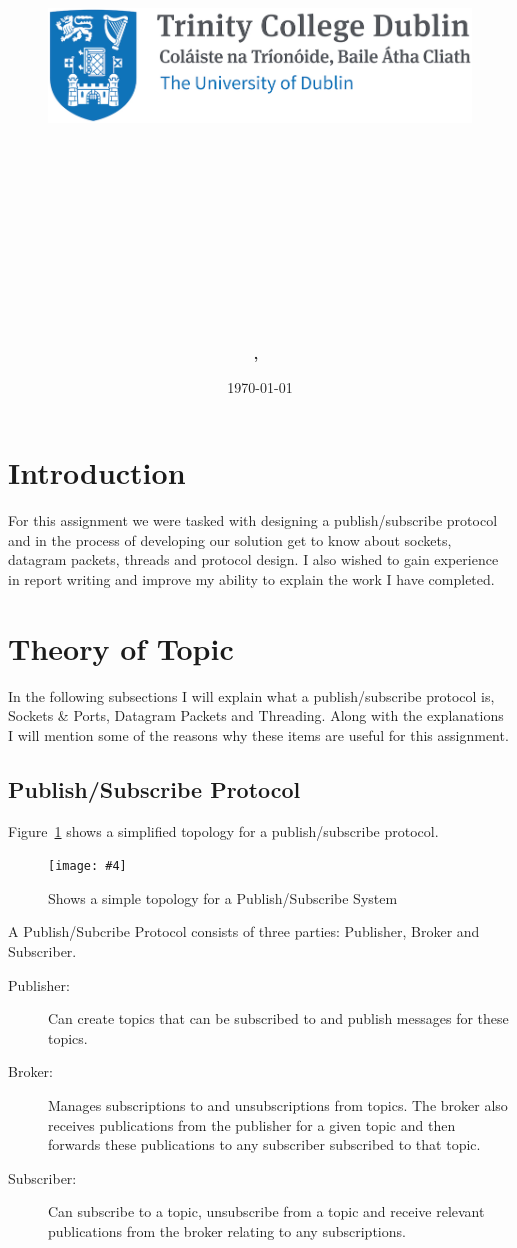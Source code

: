 \documentclass{article}
\title{
\vspace{-1in}
\begin{figure}[!ht]
\flushleft
\includegraphics[width=0.4\linewidth]{reduced-trinity.png}
\end{figure}
\vspace{-0.5cm}
\hrulefill \\
\vspace{0.5cm}
\textmd{\textbf{\moduleCode\ \moduleName}}\\
\textmd{\textbf{\assignmentTitle}}\\
\vspace{0.5cm}
\hrulefill \\
}
\author{\textbf{\authorName,\ \authorID}}
\date{\today}
\newcommand{\includefigure}[4]{
\begin{figure}[htb]
\centering
\texttt{[image: \#4]}
\captionsetup{width=.8\linewidth} 
\caption[#2]{#3}
\label{#1}
\end{figure}
}
\begin{document}
\lstset{language=Java, captionpos=b, frame=single}
\captionsetup{width=.8\linewidth} 

\maketitle
\tableofcontents
\vspace{0.5in}

\pagebreak

\section{Introduction}
\label{sec:Intro}

For this assignment we were tasked with designing a publish/subscribe protocol and in the process of developing our solution get to know about sockets, datagram packets, threads and protocol design. I also wished to gain experience in report writing and improve my ability to explain the work I have completed. 


\section{Theory of Topic}
\label{sec:Theory}

In the following subsections I will explain what a publish/subscribe protocol is, Sockets {\&} Ports, Datagram Packets and Threading. Along with the explanations I will mention some of the reasons why these items are useful for this assignment.


\subsection{Publish/Subscribe Protocol}
Figure~\ref{fig:PublishSubscribe} shows a simplified topology for a publish/subscribe protocol.
\includefigure{fig:PublishSubscribe}{Topology of a Publish/Subscribe Protocol}{Shows a simple topology for a Publish/Subscribe System}{Publish-Subscribe-Protocol.PNG}

A Publish/Subcribe Protocol consists of three parties: Publisher, Broker and Subscriber. 
\begin{description}
	\item [Publisher:] Can create topics that can be subscribed to and publish messages for these topics.
	\item [Broker:] Manages subscriptions to and unsubscriptions from topics. The broker also receives publications from the publisher for a given topic and then forwards these publications to any subscriber subscribed to that topic.
	\item [Subscriber:] Can subscribe to a topic, unsubscribe from a topic and receive relevant publications from the broker relating to any subscriptions.
\end{description}
\end{document}
